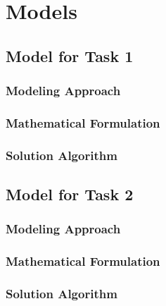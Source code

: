 \section{Models}

\subsection{Model for Task 1}
\subsubsection{Modeling Approach}
\subsubsection{Mathematical Formulation}
\subsubsection{Solution Algorithm}

\subsection{Model for Task 2}
\subsubsection{Modeling Approach}
\subsubsection{Mathematical Formulation}
\subsubsection{Solution Algorithm}
